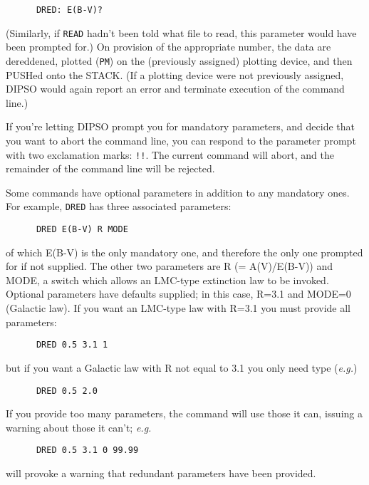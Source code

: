 \begin{verbatim}
      DRED: E(B-V)?
\end{verbatim}

(Similarly, if {\tt READ} hadn't been told what file to read, this
parameter would have been prompted for.) On provision of the
appropriate number, the data are dereddened, plotted ({\tt PM}) on the
(previously assigned) plotting device, and then PUSHed onto the STACK.
(If a plotting device were not previously assigned, DIPSO would again
report an error and terminate execution of the command line.)

If you're letting DIPSO prompt you for mandatory parameters, and
decide that you want to abort the command line, you can respond to the
parameter prompt with two exclamation marks: {\tt !!}. The current
command will abort, and the remainder of the command line will be
rejected.

Some commands have optional parameters in addition to any mandatory
ones. For example, {\tt DRED} has three associated parameters:

\begin{verbatim}
      DRED E(B-V) R MODE
\end{verbatim}

of which E(B-V) is the only mandatory one, and therefore the only one
prompted for if not supplied. The other two parameters are R (=
A(V)/E(B-V)) and MODE, a switch which allows an LMC-type extinction
law to be invoked. Optional parameters have defaults supplied; in this
case, R=3.1 and MODE=0 (Galactic law). If you want an LMC-type law
with R=3.1 you must provide all parameters:

\begin{verbatim}
      DRED 0.5 3.1 1
\end{verbatim}

but if you want a Galactic law with R not equal to 3.1 you only need
type ({\em e.g.})

\begin{verbatim}
      DRED 0.5 2.0
\end{verbatim}

If you provide too many parameters, the command will use those it can,
issuing a warning about those it can't; {\em e.g.}

\begin{verbatim}
      DRED 0.5 3.1 0 99.99
\end{verbatim}

will provoke a warning that redundant parameters have been provided.

